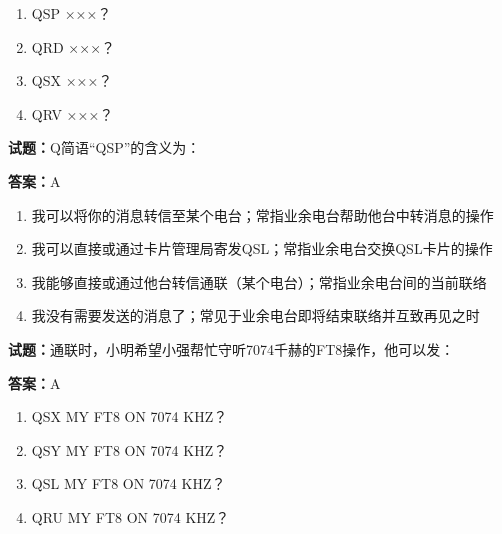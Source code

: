 \documentclass{ctexbook}
\begin{document}
\begin{enumerate}[leftmargin=3em]
  \item QSP ×××？ 

  \item QRD ×××？ 

  \item QSX ×××？ 

  \item QRV ×××？ 

\end{enumerate}





\vspace{1em}

\textbf{试题：}Q简语“QSP”的含义为： 

\textbf{答案：}A 

\begin{enumerate}[leftmargin=3em]
  \item 我可以将你的消息转信至某个电台；常指业余电台帮助他台中转消息的操作 

  \item 我可以直接或通过卡片管理局寄发QSL；常指业余电台交换QSL卡片的操作 

  \item 我能够直接或通过他台转信通联（某个电台）；常指业余电台间的当前联络 

  \item 我没有需要发送的消息了；常见于业余电台即将结束联络并互致再见之时 

\end{enumerate}





\vspace{1em}

\textbf{试题：}通联时，小明希望小强帮忙守听7074千赫的FT8操作，他可以发： 

\textbf{答案：}A 

\begin{enumerate}[leftmargin=3em]
  \item QSX MY FT8 ON 7074 KHZ？ 

  \item QSY MY FT8 ON 7074 KHZ？ 

  \item QSL MY FT8 ON 7074 KHZ？ 

  \item QRU MY FT8 ON 7074 KHZ？ 

\end{enumerate}
\end{document}
